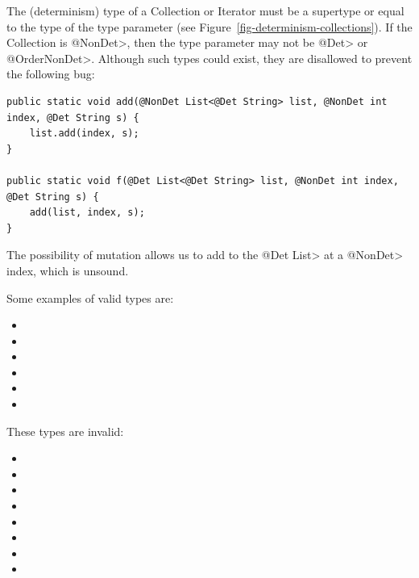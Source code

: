 The (determinism) type of a Collection or Iterator must be a supertype or equal to
the type of the type parameter (see Figure~\ref{fig-determinism-collections}).
If the Collection is \<@NonDet>, then the type parameter may not be
\<@Det> or \<@OrderNonDet>. Although such types could exist, they are
disallowed to prevent the following bug:

\begin{verbatim}
public static void add(@NonDet List<@Det String> list, @NonDet int index, @Det String s) {
    list.add(index, s);
}

public static void f(@Det List<@Det String> list, @NonDet int index, @Det String s) {
    add(list, index, s);
}
\end{verbatim}

The possibility of mutation allows us to add to the \<@Det List> at a
\<@NonDet> index, which is unsound.


Some examples of valid types are:
\begin{itemize}
    \item {}
    \item {}
    \item {}
    \item {}
    \item {}
    \item {}
\end{itemize}

These types are invalid:
\begin{itemize}
    \item {}
    \item {}
    \item {}
    \item {}
    \item {}
    \item {}
    \item {}
    \item {}
\end{itemize}

